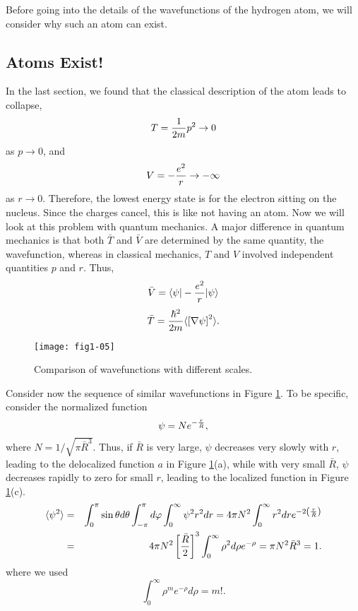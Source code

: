 Before going into the details of the wavefunctions of the hydrogen atom, we will
consider why such an atom can exist.

\subsection{Atoms Exist!}

In the last section, we found that the classical description of the
atom leads to collapse,
\begin{equation}
T = {1 \over 2m} p^2 \rightarrow 0
\end{equation}
as $p \rightarrow 0$, and
\begin{equation}
V = - {e^2 \over r} \rightarrow - \infty
\end{equation}
as $r \rightarrow 0$.  Therefore, the lowest energy state is for the
electron sitting on the nucleus.  Since the charges cancel, this is
like not having an atom. Now we will look at this problem with quantum
mechanics. A major difference in quantum mechanics is that both $\bar
T$ and ${\bar V}$ are determined by the same quantity, the
wavefunction, whereas in classical mechanics, $T$ and $V$ involved
independent quantities $p$ and $r$. Thus,
\begin{equation}
{\bar V} = \langle \psi \vert - {e^2 \over r} \vert \psi \rangle
\end{equation}
\begin{equation}
{\bar T} = {\hbar^2 \over 2m} \langle \left[ \nabla \psi \right]^2
\rangle. 
\end{equation}

\begin{figure}
\texttt{[image: fig1-05]}
\caption{Comparison of wavefunctions with different scales.}
\label{fig1-5}
\end{figure}

Consider now the sequence of similar wavefunctions in Figure
\ref{fig1-5}.  To be specific, consider the normalized function
\begin{equation}
\psi = Ne^{-{r \over {\bar R}}} ,
\end{equation}
where $N = 1 / \sqrt{ \pi {\bar R}^3}$.  Thus, if ${\bar R}$ is very
large, $\psi$ decreases very slowly with $r$, leading to the
delocalized function $a$ in Figure \ref{fig1-5}(a), while with very
small ${\bar R}$, $\psi$ decreases rapidly to zero for small $r$,
leading to the localized function in Figure \ref{fig1-5}(c).
\begin{eqnarray}
\langle \psi^2 \rangle &=& \int^{\pi}_{0} \sin \theta d\theta 
     \int^{\pi}_{- \pi} d\varphi 
     \int^{\infty}_{0} \psi^2 r^2 dr = 4 \pi N^2 \int^{\infty}_{0} r^2 dre^{-2 
\left( {r \over {\bar R}} \right)}\cr 
&=& 4 \pi N^2 \left[ {{\bar R} \over 2} \right]^3 \int^{\infty}_{0} \rho^2 
d \rho e^{- \rho} = \pi N^2 {\bar R}^3 = 1.
\end{eqnarray}
where we used
\begin{equation}
\int^{\infty}_{0} \rho^me^{- \rho} d \rho = m!.
\end{equation}

